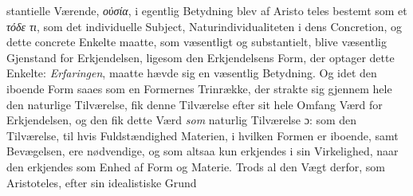\documentclass[12pt,a4paper]{book}
\newcommand{\divrule}{\begin{center}\rule{2cm}{0.4pt}\end{center}}
\newcommand{\gk}[1]{\textit{#1}}
\begin{document}
stantielle Værende, \gk{οὐσία}, i egentlig Betydning blev af Aristo\-%
teles bestemt som et \gk{τόδε τι}, som det individuelle Subject,
Naturindividualiteten i dens Concretion, og dette concrete
Enkelte maatte, som væsentligt og substantielt, blive væsentlig
Gjenstand for Erkjendelsen, ligesom den Erkjendelsens Form,
der optager dette Enkelte: \emph{Erfaringen}, maatte hævde sig en
væsentlig Betydning. Og idet den iboende Form saaes som
en Formernes Trinrække, der strakte sig gjennem hele den
naturlige Tilværelse, fik denne Tilværelse efter sit hele Omfang
Værd for Erkjendelsen, og den fik dette Værd \emph{som} naturlig
Tilværelse ɔ: som den Tilværelse, til hvis Fuldstændighed
Materien, i hvilken Formen er iboende, samt Bevægelsen, ere
nødvendige, og som altsaa kun erkjendes i sin Virkelighed,
naar den erkjendes som Enhed af Form og Materie. Trods al
den Vægt derfor, som Aristoteles, efter sin idealistiske Grund\-%
\end{document}
